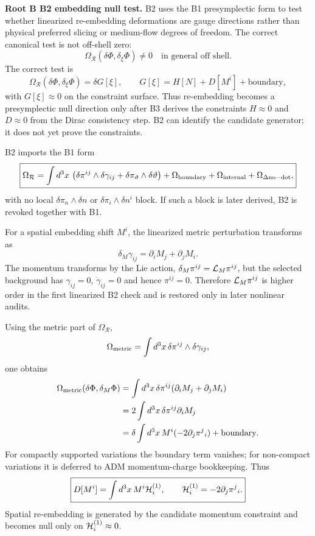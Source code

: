 \documentclass[11pt]{article}
\begin{document}
\medskip\noindent\textbf{Root B B2 embedding null test.}
B2 uses the B1 presymplectic form to test whether linearized re-embedding
deformations are gauge directions rather than physical preferred slicing or
medium-flow degrees of freedom.  The correct canonical test is not off-shell
zero:
\[
\boxed{\Omega_{\mathcal R}(\delta\Phi,\delta_\xi\Phi)\ne0
\quad\text{in general off shell}.}
\]
The correct test is
\[
\boxed{
\Omega_{\mathcal R}(\delta\Phi,\delta_\xi\Phi)
=\delta G[\xi],
\qquad
G[\xi]=H[N]+D[M^i]+\text{boundary},
}
\]
with \(G[\xi]\approx0\) on the constraint surface.  Thus re-embedding becomes
a presymplectic null direction only after B3 derives the constraints
\(H\approx0\) and \(D\approx0\) from the Dirac consistency step.  B2 can
identify the candidate generator; it does not yet prove the constraints.

B2 imports the B1 form
\[
\boxed{
\Omega_{\mathcal R}
=\int d^3x\,
\left(
\delta\pi^{ij}\wedge\delta\gamma_{ij}
+\delta\pi_\vartheta\wedge\delta\vartheta
\right)
+\Omega_{\rm boundary}
+\Omega_{\rm internal}
+\Omega_{\Delta{\rm no-dot}},
}
\]
with no local \(\delta\pi_n\wedge\delta n\) or
\(\delta\pi_i\wedge\delta n^i\) block.  If such a block is later derived, B2
is revoked together with B1.

For a spatial embedding shift \(M^i\), the linearized metric perturbation
transforms as
\[
\boxed{\delta_M\gamma_{ij}=\partial_iM_j+\partial_jM_i.}
\]
The momentum transforms by the Lie action,
\(\delta_M\pi^{ij}={\cal L}_M\pi^{ij}\), but the selected background has
\(\gamma_{ij}=0\), \(\dot\gamma_{ij}=0\) and hence \(\pi^{ij}=0\).  Therefore
\({\cal L}_M\pi^{ij}\) is higher order in the first linearized B2 check and is
restored only in later nonlinear audits.

Using the metric part of \(\Omega_{\mathcal R}\),
\[
\Omega_{\rm metric}
=\int d^3x\,\delta\pi^{ij}\wedge\delta\gamma_{ij},
\]
one obtains
\[
\begin{aligned}
\Omega_{\rm metric}(\delta\Phi,\delta_M\Phi)
&=\int d^3x\,\delta\pi^{ij}
(\partial_iM_j+\partial_jM_i)\\
&=2\int d^3x\,\delta\pi^{ij}\partial_iM_j\\
&=\delta\int d^3x\,M^i(-2\partial_j\pi^j{}_i)
+\text{boundary}.
\end{aligned}
\]
For compactly supported variations the boundary term vanishes; for
non-compact variations it is deferred to ADM momentum-charge bookkeeping.
Thus
\[
\boxed{
D[M^i]=\int d^3x\,M^i{\cal H}_i^{(1)},\qquad
{\cal H}_i^{(1)}=-2\partial_j\pi^j{}_i.
}
\]
Spatial re-embedding is generated by the candidate momentum constraint and
becomes null only on \({\cal H}_i^{(1)}\approx0\).
\end{document}
